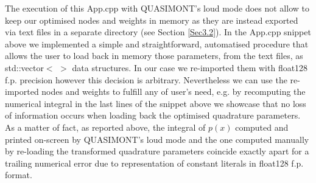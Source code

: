 \documentclass[a4paper, twosided]{book}
\begin{document}
\vspace{0.2cm}
\vspace{0.3cm}

\noindent
The execution of this \colorbox{poliGrayBlue}{App.cpp} with QUASIMONT's loud mode does not allow to keep our optimised nodes and weights in memory as they are instead exported via text files in a separate directory (see Section \ref{Sec3.2}). In the \colorbox{poliGrayBlue}{App.cpp} snippet above we implemented a simple and straightforward, automatised procedure that allows the user to load back in memory those parameters, from the text files, as \colorbox{poliGrayBlue}{std::vector$<$ $>$} data structures. In our case we re-imported them with \colorbox{poliGrayBlue}{float128} f.p. precision however this decision is arbitrary. Nevertheless we can use the re-imported nodes and weights to fulfill any of user's need, e.g. by recomputing the numerical integral in the last lines of the snippet above we showcase that no loss of information occurs when loading back the optimised quadrature parameters. As a matter of fact, as reported above, the integral of $p(x)$ computed and printed on-screen by QUASIMONT's loud mode and the one computed manually by re-loading the transformed quadrature parameters coincide exactly apart for a trailing numerical error due to representation of constant literals in \colorbox{poliGrayBlue}{float128} f.p. format.
\end{document}
